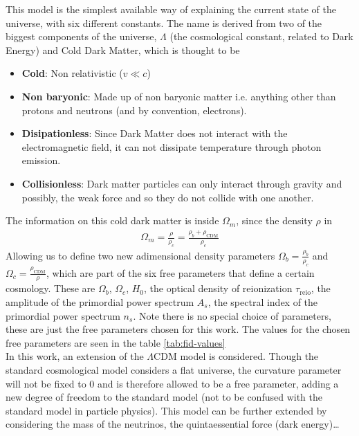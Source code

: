 This model is the simplest available way of explaining the current state of the universe, with six different constants. The name is derived from two of the biggest components of the universe, $\Lambda$ (the cosmological constant, related to Dark Energy) and Cold Dark Matter, which is thought to be
\begin{itemize}
	\item \textbf{Cold}: Non relativistic ($v \ll c$)
	\item \textbf{Non baryonic}: Made up of non baryonic matter i.e. anything other than protons and neutrons (and by convention, electrons).
	\item \textbf{Disipationless}: Since Dark Matter does not interact with the electromagnetic field, it can not dissipate temperature through photon emission.
	\item \textbf{Collisionless}: Dark matter particles can only interact through gravity and possibly, the weak force and so they do not collide with one another.
\end{itemize}
The information on this cold dark matter is inside $\Omega_m$, since the density $\rho$ in
\begin{align}
	\Omega_m = \frac{\rho}{\rho_c} = \frac{\rho_b + \rho_{\text{CDM}}}{\rho_c}
\end{align}
Allowing us to define two new adimensional density parameters $\Omega_b = \frac{\rho_b}{\rho_c}$ and $\Omega_c =  \frac{\rho_\text{CDM}}{\rho}$, which are part of the six free parameters that define a certain cosmology. These are $\Omega_b$, $\Omega_c$, $H_0$, the optical density of reionization $\tau_{\text{reio}}$, the amplitude of the primordial power spectrum $A_s$, the spectral index of the primordial power spectrum $n_s$. Note there is no special choice of parameters, these are just the free parameters chosen for this work. The values for the chosen free parameters are seen in the table \ref{tab:fid-values}\\

In this work, an extension of the $\Lambda$CDM model is considered. Though the standard cosmological model considers a flat universe, the curvature parameter will not be fixed to $0$ and is therefore allowed to be a free parameter, adding a new degree of freedom to the standard model (not to be confused with the standard model in particle physics). This model can be further extended by considering the mass of the neutrinos, the quintaessential force (dark energy)\ldots  \\

